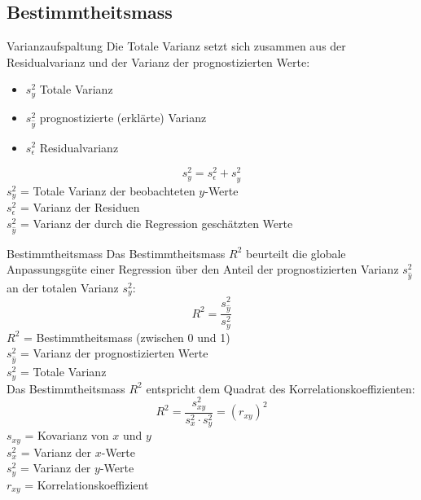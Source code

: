 \subsection{Bestimmtheitsmass}
\begin{concept}{Varianzaufspaltung}
Die Totale Varianz setzt sich zusammen aus der Residualvarianz und der Varianz der prognostizierten Werte:
\begin{itemize}
  \item $s_y^2$ Totale Varianz
  \item $s_{\hat{y}}^2$ prognostizierte (erklärte) Varianz
  \item $s_{\epsilon}^2$ Residualvarianz
\end{itemize}

$$
s_y^2=s_{\epsilon}^2+s_{\hat{y}}^2
$$
$s_y^2$ = Totale Varianz der beobachteten $y$-Werte\\
$s_{\epsilon}^2$ = Varianz der Residuen\\
$s_{\hat{y}}^2$ = Varianz der durch die Regression geschätzten Werte\\
\end{concept}

\begin{theorem}{Bestimmtheitsmass}
Das Bestimmtheitsmass $R^2$ beurteilt die globale Anpassungsgüte einer Regression über den Anteil der prognostizierten Varianz $s_{\hat{y}}^2$ an der totalen Varianz $s_y^2$:
$$
R^2=\frac{s_{\hat{y}}^2}{s_y^2}
$$
$R^2$ = Bestimmtheitsmass (zwischen 0 und 1)\\
$s_{\hat{y}}^2$ = Varianz der prognostizierten Werte\\
$s_y^2$ = Totale Varianz\\

Das Bestimmtheitsmass $R^2$ entspricht dem Quadrat des Korrelationskoeffizienten:
$$
R^2=\frac{s_{xy}^2}{s_x^2 \cdot s_y^2}=(r_{xy})^2
$$
$s_{xy}$ = Kovarianz von $x$ und $y$\\
$s_x^2$ = Varianz der $x$-Werte\\
$s_y^2$ = Varianz der $y$-Werte\\
$r_{xy}$ = Korrelationskoeffizient\\
\end{theorem}

